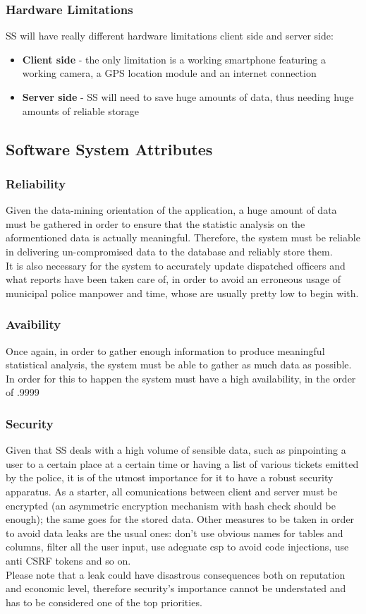 	\subsubsection{Hardware Limitations}
	SS will have really different hardware limitations client side and server side:
	\begin{itemize}
		\item \textbf{Client side} - the only limitation is a working smartphone featuring a working camera, a GPS location module and an internet connection 
		\item \textbf{Server side} - SS will need to save huge amounts of data, thus needing huge amounts of reliable storage
	\end{itemize}
	 
\subsection{Software System Attributes}
	\subsubsection{Reliability}
	Given the data-mining orientation of the application, a huge amount of data must be gathered in order to ensure that the statistic analysis on the aformentioned data is actually meaningful. Therefore, the system must be reliable in delivering un-compromised data to the database and reliably store them.\\
	It is also necessary for the system to accurately update dispatched officers and what reports have been taken care of, in order to avoid an erroneous usage of municipal police manpower and time, whose are usually pretty low to begin with.
	\subsubsection{Avaibility}
	Once again, in order to gather enough information to produce meaningful statistical analysis, the system must be able to gather as much data as possible. In order for this to happen the system must have a high availability, in the order of .9999
	\subsubsection{Security}
	Given that SS deals with a high volume of sensible data, such as pinpointing a user to a certain place at a certain time or having a list of various tickets emitted by the police, it is of the utmost importance for it to have a robust security apparatus. As a starter, all comunications between client and server must be encrypted (an asymmetric encryption mechanism with hash check should be enough); the same goes for the stored data. Other measures to be taken in order to avoid data leaks are the usual ones: don't use obvious names for tables and columns, filter all the user input, use adeguate csp to avoid code injections, use anti CSRF tokens and so on.\\
	Please note that a leak could have disastrous consequences both on reputation and economic level, therefore security's importance cannot be understated and has to be considered one of the top priorities. 
